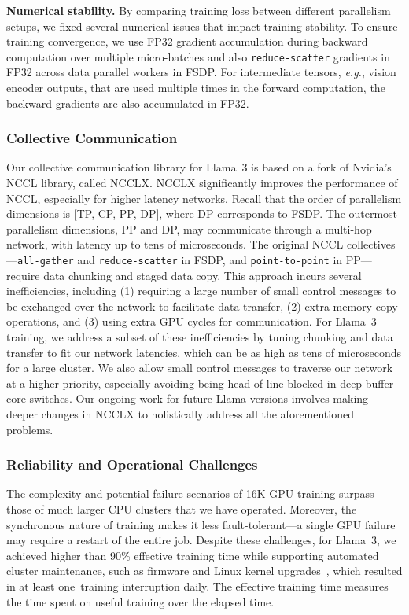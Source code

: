 \textbf{Numerical stability.} By comparing training loss between different parallelism setups, we fixed several numerical issues that impact training stability. To ensure training convergence, we use FP32 gradient accumulation during backward computation over multiple micro-batches and also \texttt{reduce-scatter} gradients in FP32 across data parallel workers in FSDP. For intermediate tensors, \emph{e.g.}, vision encoder outputs, that are used multiple times in the forward computation, the backward gradients are also accumulated in FP32.

\subsubsection{Collective Communication}
\label{sec:ncclx}

Our collective communication library for Llama~3 is based on a fork of Nvidia's NCCL library, called NCCLX. NCCLX significantly improves the performance of NCCL, especially for higher latency networks. Recall that the order of parallelism dimensions is [TP, CP, PP, DP], where DP corresponds to FSDP. The outermost parallelism dimensions, PP and DP, may communicate through a multi-hop network, with latency up to tens of microseconds. The original NCCL collectives---\texttt{all-gather} and \texttt{reduce-scatter} in FSDP, and \texttt{point-to-point} in PP---require data chunking and staged data copy. This approach incurs several inefficiencies, including (1) requiring a large number of small control messages to be exchanged over the network to facilitate data transfer, (2) extra memory-copy operations, and (3) using extra GPU cycles for communication.  For Llama~3 training, we address a subset of these inefficiencies by tuning chunking and data transfer to fit our network latencies, which can be as high as tens of microseconds for a large cluster. We also allow small control messages to traverse our network at a higher priority, especially avoiding being head-of-line blocked in deep-buffer core switches. Our ongoing work for future Llama versions involves making deeper changes in NCCLX to holistically address all the aforementioned problems.

\subsubsection{Reliability and Operational Challenges}

The complexity and potential failure scenarios of 16K GPU training surpass those of much larger CPU clusters that we have operated. Moreover, the synchronous nature of training makes it less fault-tolerant---a single GPU failure may require a restart of the entire job. Despite these challenges, for Llama~3, we achieved higher than 90\% effective training time while supporting automated cluster maintenance, such as firmware and Linux kernel upgrades~\citep{leonhardi2024maintenance}, which resulted in at least one~training interruption daily. The effective training time measures the time spent on useful training over the elapsed time.

